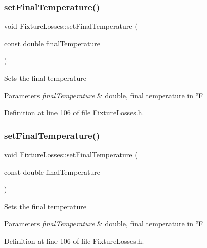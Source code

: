 \subsubsection{\texorpdfstring{set\+Final\+Temperature()}{setFinalTemperature()}\hspace{0.1cm}{\footnotesize\ttfamily [2/3]}}
{\footnotesize\ttfamily void Fixture\+Losses\+::set\+Final\+Temperature (\begin{DoxyParamCaption}\item[{const double}]{final\+Temperature }\end{DoxyParamCaption})\hspace{0.3cm}{\ttfamily [inline]}}

Sets the final temperature 
\begin{DoxyParams}{Parameters}
{\em final\+Temperature} & double, final temperature in °F \\
\hline
\end{DoxyParams}


Definition at line 106 of file Fixture\+Losses.\+h.

\mbox{\label{class_fixture_losses_a5b65e7118cb96c4f4c88c0d6d1a4f6d3}} 
\subsubsection{\texorpdfstring{set\+Final\+Temperature()}{setFinalTemperature()}\hspace{0.1cm}{\footnotesize\ttfamily [3/3]}}
{\footnotesize\ttfamily void Fixture\+Losses\+::set\+Final\+Temperature (\begin{DoxyParamCaption}\item[{const double}]{final\+Temperature }\end{DoxyParamCaption})\hspace{0.3cm}{\ttfamily [inline]}}

Sets the final temperature 
\begin{DoxyParams}{Parameters}
{\em final\+Temperature} & double, final temperature in °F \\
\hline
\end{DoxyParams}


Definition at line 106 of file Fixture\+Losses.\+h.

\mbox{\label{class_fixture_losses_ad3f2a1013dc5da103f2bcfc1357a449b}} 
